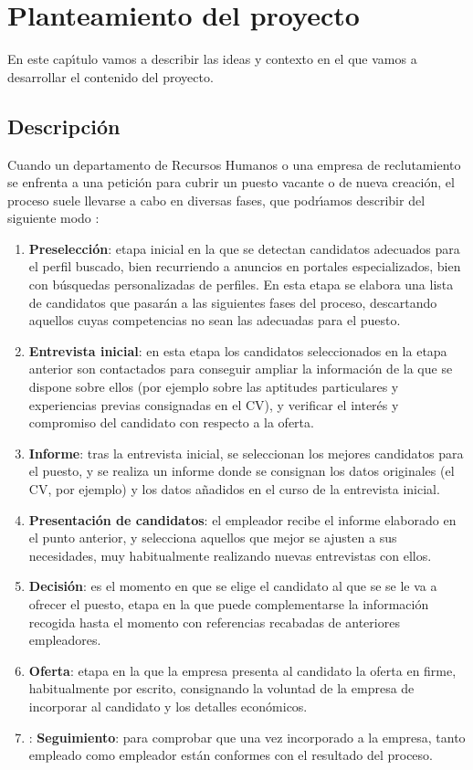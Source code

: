 \chapter{Planteamiento del proyecto}

En este cap\'\i tulo vamos a describir las ideas y contexto en el que vamos a desarrollar el contenido del proyecto.

\section{Descripci\'on}
Cuando un departamento de Recursos Humanos o una empresa de reclutamiento se enfrenta a una petici\'on para
cubrir un puesto vacante o de nueva creaci\'on, el proceso suele llevarse a cabo en diversas fases, que 
podr\'\i amos describir del siguiente modo \cite{proceso_seleccion1}:
\begin{enumerate}
\item {\bf Preselección}: etapa inicial en la que se detectan candidatos adecuados para el perfil buscado, bien recurriendo a 
anuncios en portales especializados, bien con b\'usquedas personalizadas de perfiles. En esta etapa se elabora una lista 
de candidatos que pasar\'an a las siguientes fases del proceso, descartando aquellos cuyas competencias no sean las adecuadas
para el puesto. 
\item {\bf Entrevista inicial}: en esta etapa los candidatos seleccionados en la etapa anterior son contactados para  
conseguir ampliar la informaci\'on de la que se dispone sobre ellos  (por ejemplo sobre las aptitudes
particulares y experiencias previas consignadas en el CV), y verificar el inter\'es y compromiso del candidato
con respecto a la oferta.
\item {\bf Informe}: tras la entrevista inicial, se seleccionan los mejores candidatos para el puesto, y se realiza un informe
donde se consignan los datos originales (el CV, por ejemplo) y los datos a\~nadidos en el curso de la entrevista inicial.
\item {\bf Presentaci\'on de candidatos}: el empleador recibe el informe elaborado en el punto anterior, y selecciona aquellos
que mejor se ajusten a sus necesidades, muy habitualmente realizando nuevas entrevistas con ellos.
\item {\bf Decisi\'on}: es el momento en que se elige el candidato al que se se le va a ofrecer el puesto, etapa en la 
que puede complementarse la informaci\'on recogida hasta el momento con referencias recabadas de anteriores empleadores.
\item {\bf Oferta}: etapa en la que la empresa presenta al candidato la oferta en firme, habitualmente por escrito, consignando 
la voluntad de la empresa de incorporar al candidato y los detalles econ\'omicos. 
\item: {\bf Seguimiento}:  para comprobar que una vez incorporado a la empresa, tanto empleado como empleador est\'an conformes con
el resultado del proceso.
\end{enumerate}

